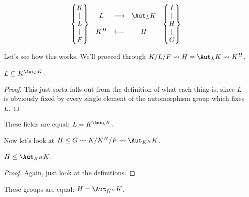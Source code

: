 \[
	\begin{matrix}
	\left\{ \begin{matrix}
		K \\ \mid \\ L \\ \mid \\ F
	\end{matrix} \right\}
	 & 
	 \begin{matrix}
	 L & \longrightarrow & \Aut_L K \\ \\
	 K^H & \longleftarrow & H
	 \end{matrix}
	 &
	 \left\{ \begin{matrix}
		I \\ \mid \\ H \\ \mid \\ G
	\end{matrix} \right\}
	\end{matrix}
\]

Let's see how this works. We'll proceed through $K/L/F \rightsquigarrow H = \Aut_L K \rightsquigarrow K^H$. 

\begin{claim}
$L \subseteq K^{\Aut_L K}$. 
\begin{proof}
This just sorta falls out from the definition of what each thing is, since $L$ is obviously fixed by every single element of the automorphism group which fixes $L$.
\end{proof}
\end{claim}

\begin{theorem}
These fields are equal: $L = K^{\Aut_L K}$.
\end{theorem}

Now let's look at $H \leq G \rightsquigarrow K/K^H/F \rightsquigarrow \Aut_{K^H} K$.

\begin{claim}
$H \leq \Aut_{K^H} K$.
\begin{proof}
Again, just look at the definitions.
\end{proof}
\end{claim}

\begin{theorem}
These groups are equal: $H = \Aut_{K^H} K$.
\end{theorem}

